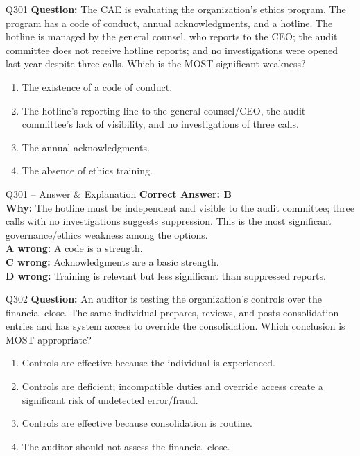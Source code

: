 \documentclass[aspectratio=169,10pt]{beamer}
\begin{document}
	\begin{frame}[t]{Q301}
		\small
		\textbf{Question:} The CAE is evaluating the organization's ethics program. The program has a code of conduct, annual acknowledgments, and a hotline. The hotline is managed by the general counsel, who reports to the CEO; the audit committee does not receive hotline reports; and no investigations were opened last year despite three calls. Which is the MOST significant weakness?
		\begin{enumerate}[label=\Alph*.,itemsep=1pt,topsep=2pt]
			\item The existence of a code of conduct.
			\item The hotline's reporting line to the general counsel/CEO, the audit committee's lack of visibility, and no investigations of three calls.
			\item The annual acknowledgments.
			\item The absence of ethics training.
		\end{enumerate}
	\end{frame}
	
	\begin{frame}[t]{Q301 -- Answer \& Explanation}
		\small
		\textbf{Correct Answer: B} \\[4pt]
		\textbf{Why:} The hotline must be independent and visible to the audit committee; three calls with no investigations suggests suppression. This is the most significant governance/ethics weakness among the options. \\[4pt]
		\textbf{A wrong:} A code is a strength. \\[2pt]
		\textbf{C wrong:} Acknowledgments are a basic strength. \\[2pt]
		\textbf{D wrong:} Training is relevant but less significant than suppressed reports.
	\end{frame}
	
	\begin{frame}[t]{Q302}
		\small
		\textbf{Question:} An auditor is testing the organization's controls over the financial close. The same individual prepares, reviews, and posts consolidation entries and has system access to override the consolidation. Which conclusion is MOST appropriate?
		\begin{enumerate}[label=\Alph*.,itemsep=1pt,topsep=2pt]
			\item Controls are effective because the individual is experienced.
			\item Controls are deficient; incompatible duties and override access create a significant risk of undetected error/fraud.
			\item Controls are effective because consolidation is routine.
			\item The auditor should not assess the financial close.
		\end{enumerate}
	\end{frame}
	
\end{document}
